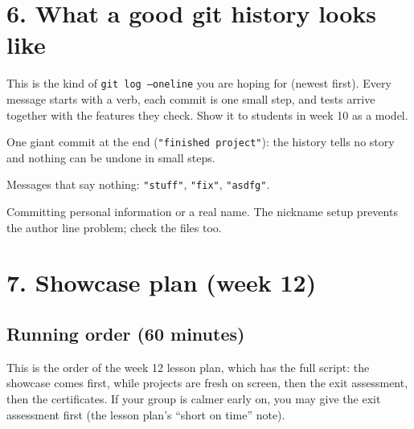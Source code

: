 \documentclass[level=3,teacher]{kidscode}
\begin{document}
\section{6. What a good git history looks like}

This is the kind of \texttt{git log --oneline} you are hoping for (newest first). Every message
starts with a verb, each commit is one small step, and tests arrive together with the features
they check. Show it to students in week 10 as a model.


\begin{commonmistakes}
  \item One giant commit at the end (\texttt{"finished project"}): the history tells no story and
        nothing can be undone in small steps.
  \item Messages that say nothing: \texttt{"stuff"}, \texttt{"fix"}, \texttt{"asdfg"}.
  \item Committing personal information or a real name. The nickname setup prevents the author
        line problem; check the files too.
\end{commonmistakes}

\clearpage
\section{7. Showcase plan (week 12)}

\subsection{Running order (60 minutes)}
This is the order of the week 12 lesson plan, which has the full script: the showcase comes
first, while projects are fresh on screen, then the exit assessment, then the certificates. If
your group is calmer early on, you may give the exit assessment first (the lesson plan's
\enquote{short on time} note).
\end{document}
